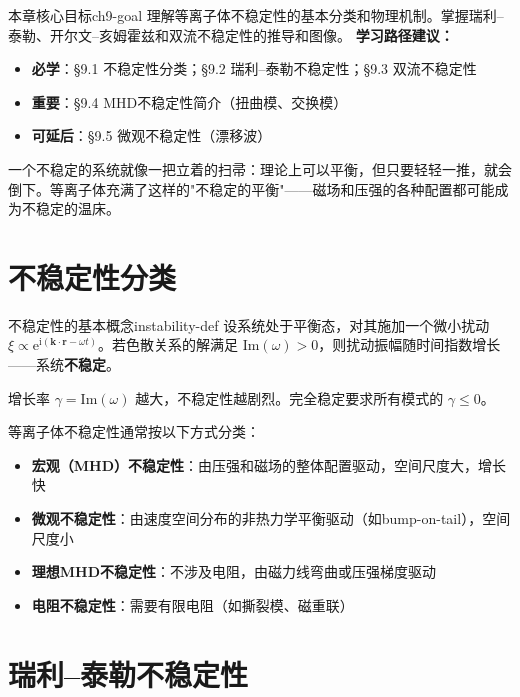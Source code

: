\documentclass[12pt,a4paper,openany,oneside]{book}
\newcommand{\ii}{\mathrm{i}}
\newcommand{\ee}{\mathrm{e}}
\newcommand{\vect}[1]{\bm{#1}}
\newcommand{\difficulty}[1]{\marginnote{\textcolor{red}{\textbf{[#1]}}}}
\begin{document}
\begin{insight}{本章核心目标}{ch9-goal}
理解等离子体不稳定性的基本分类和物理机制。掌握瑞利--泰勒、开尔文--亥姆霍兹和双流不稳定性的推导和图像。
\tcblower
\textbf{学习路径建议：}

\begin{itemize}[leftmargin=*]
\item[\textcolor{red}{$\blacksquare$}] \textbf{必学}：\S9.1 不稳定性分类；\S9.2 瑞利--泰勒不稳定性；\S9.3 双流不稳定性
\item[\textcolor{orange}{$\blacksquare$}] \textbf{重要}：\S9.4 MHD不稳定性简介（扭曲模、交换模）
\item[\textcolor{green}{$\blacksquare$}] \textbf{可延后}：\S9.5 微观不稳定性（漂移波）
\end{itemize}
\end{insight}

一个不稳定的系统就像一把立着的扫帚：理论上可以平衡，但只要轻轻一推，就会倒下。等离子体充满了这样的"不稳定的平衡"——磁场和压强的各种配置都可能成为不稳定的温床。

\section{不稳定性分类}\difficulty{基础}

\begin{definition}{不稳定性的基本概念}{instability-def}
设系统处于平衡态，对其施加一个微小扰动 $\xi \propto \ee^{\ii(\vect{k}\cdot\vect{r}-\omega t)}$。若色散关系的解满足 $\text{Im}(\omega) > 0$，则扰动振幅随时间指数增长——系统\textbf{不稳定}。

增长率 $\gamma = \text{Im}(\omega)$ 越大，不稳定性越剧烈。完全稳定要求所有模式的 $\gamma \leq 0$。
\end{definition}

等离子体不稳定性通常按以下方式分类：
\begin{itemize}
\item \textbf{宏观（MHD）不稳定性}：由压强和磁场的整体配置驱动，空间尺度大，增长快
\item \textbf{微观不稳定性}：由速度空间分布的非热力学平衡驱动（如bump-on-tail），空间尺度小
\item \textbf{理想MHD不稳定性}：不涉及电阻，由磁力线弯曲或压强梯度驱动
\item \textbf{电阻不稳定性}：需要有限电阻（如撕裂模、磁重联）
\end{itemize}

\section{瑞利--泰勒不稳定性}\difficulty{提高}
\end{document}
